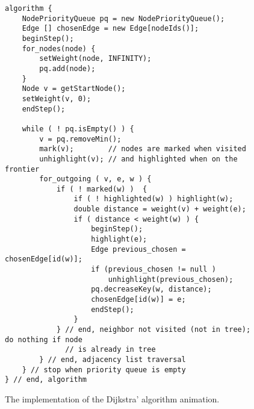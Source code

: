 \begin{figure}

\small

\begin{verbatim}
algorithm {
    NodePriorityQueue pq = new NodePriorityQueue();
    Edge [] chosenEdge = new Edge[nodeIds()]; 
    beginStep();
    for_nodes(node) {
        setWeight(node, INFINITY);
        pq.add(node);
    }
    Node v = getStartNode();
    setWeight(v, 0);
    endStep();

    while ( ! pq.isEmpty() ) {
        v = pq.removeMin();
        mark(v);        // nodes are marked when visited
        unhighlight(v); // and highlighted when on the frontier
        for_outgoing ( v, e, w ) {
            if ( ! marked(w) )  {
                if ( ! highlighted(w) ) highlight(w);
                double distance = weight(v) + weight(e);
                if ( distance < weight(w) ) {
                    beginStep();
                    highlight(e);
                    Edge previous_chosen = chosenEdge[id(w)];
                    if (previous_chosen != null )
                        unhighlight(previous_chosen);
                    pq.decreaseKey(w, distance);
                    chosenEdge[id(w)] = e;
                    endStep();
                }
            } // end, neighbor not visited (not in tree); do nothing if node
              // is already in tree
        } // end, adjacency list traversal
    } // stop when priority queue is empty
} // end, algorithm
\end{verbatim}

\caption{The implementation of the Dijkstra' algorithm animation.}
\label{fig:dijkstra}
\end{figure}
